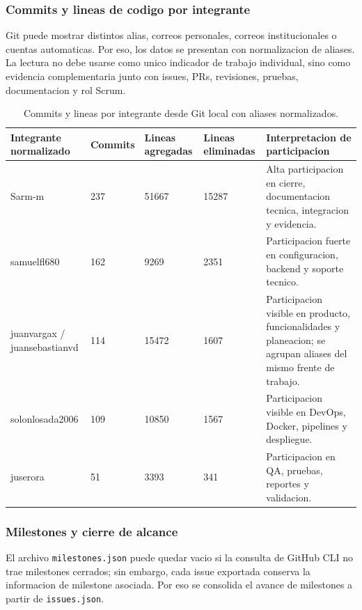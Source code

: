 \documentclass[11pt,a4paper]{article}
\begin{document}
\subsubsection{Commits y lineas de codigo por integrante}

Git puede mostrar distintos alias, correos personales, correos institucionales o cuentas automaticas. Por eso, los datos se presentan con normalizacion de aliases. La lectura no debe usarse como unico indicador de trabajo individual, sino como evidencia complementaria junto con issues, PRs, revisiones, pruebas, documentacion y rol Scrum.

\begin{table}[H]
\centering
\small
\begin{tabularx}{\linewidth}{P{3.7cm}P{1.8cm}P{2.4cm}P{2.4cm}Y}
\toprule
\textbf{Integrante normalizado} & \textbf{Commits} & \textbf{Lineas agregadas} & \textbf{Lineas eliminadas} & \textbf{Interpretacion de participacion} \\
\midrule
Sarm-m & 237 & 51667 & 15287 & Alta participacion en cierre, documentacion tecnica, integracion y evidencia. \\
samuelfl680 & 162 & 9269 & 2351 & Participacion fuerte en configuracion, backend y soporte tecnico. \\
juanvargax / juansebastianvd & 114 & 15472 & 1607 & Participacion visible en producto, funcionalidades y planeacion; se agrupan aliases del mismo frente de trabajo. \\
solonlosada2006 & 109 & 10850 & 1567 & Participacion visible en DevOps, Docker, pipelines y despliegue. \\
juserora & 51 & 3393 & 341 & Participacion en QA, pruebas, reportes y validacion. \\
\bottomrule
\end{tabularx}
\caption{Commits y lineas por integrante desde Git local con aliases normalizados.}
\end{table}

\subsubsection{Milestones y cierre de alcance}

El archivo \texttt{milestones.json} puede quedar vacio si la consulta de GitHub CLI no trae milestones cerrados; sin embargo, cada issue exportada conserva la informacion de milestone asociada. Por eso se consolida el avance de milestones a partir de \texttt{issues.json}.
\end{document}
